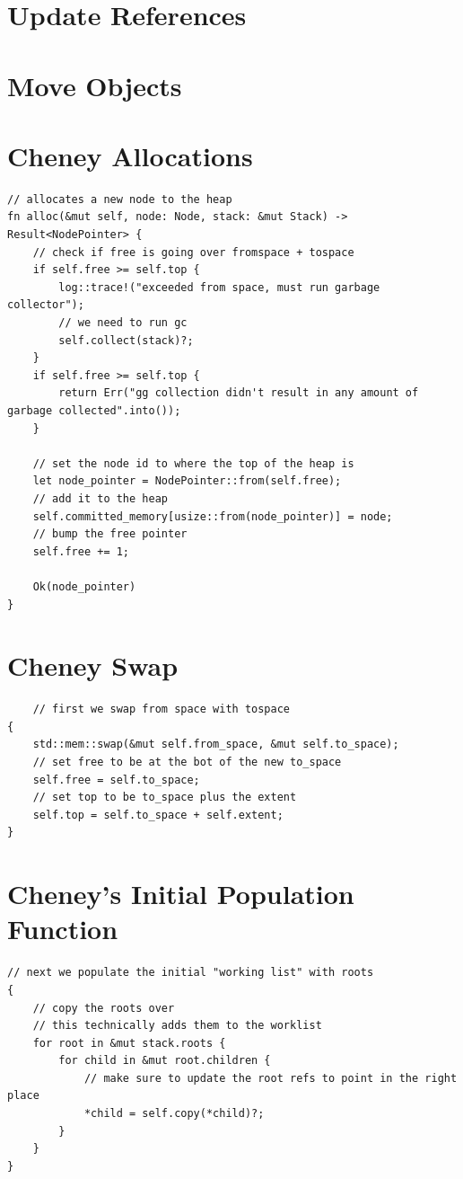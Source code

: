 \documentclass[index]{subfiles}
\begin{document}
\section{Update References}

\section{Move Objects}

\section{Cheney Allocations}
\begin{verbatim}
// allocates a new node to the heap
fn alloc(&mut self, node: Node, stack: &mut Stack) -> Result<NodePointer> {
    // check if free is going over fromspace + tospace
    if self.free >= self.top {
        log::trace!("exceeded from space, must run garbage collector");
        // we need to run gc
        self.collect(stack)?;
    }
    if self.free >= self.top {
        return Err("gg collection didn't result in any amount of garbage collected".into());
    }

    // set the node id to where the top of the heap is
    let node_pointer = NodePointer::from(self.free);
    // add it to the heap
    self.committed_memory[usize::from(node_pointer)] = node;
    // bump the free pointer
    self.free += 1;

    Ok(node_pointer)
}
\end{verbatim}
\section{Cheney Swap}
\begin{verbatim}
    // first we swap from space with tospace
{
    std::mem::swap(&mut self.from_space, &mut self.to_space);
    // set free to be at the bot of the new to_space
    self.free = self.to_space;
    // set top to be to_space plus the extent
    self.top = self.to_space + self.extent;
}
\end{verbatim}
\section{Cheney's Initial Population Function}
\begin{verbatim}
// next we populate the initial "working list" with roots
{
    // copy the roots over
    // this technically adds them to the worklist
    for root in &mut stack.roots {
        for child in &mut root.children {
            // make sure to update the root refs to point in the right place
            *child = self.copy(*child)?;
        }
    }
}
\end{verbatim}
\end{document}
